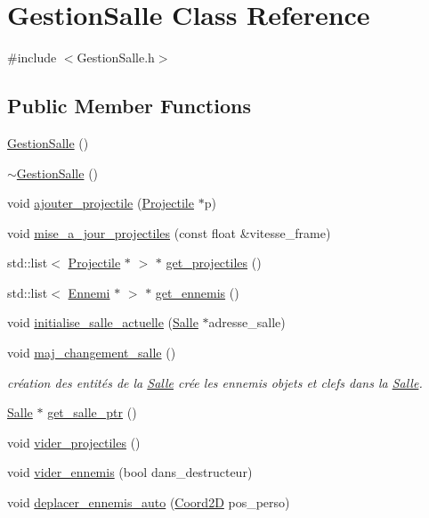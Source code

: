 \hypertarget{classGestionSalle}{}\section{Gestion\+Salle Class Reference}
\label{classGestionSalle}


{\ttfamily \#include $<$Gestion\+Salle.\+h$>$}

\subsection*{Public Member Functions}
\begin{DoxyCompactItemize}
\item 
\hyperlink{classGestionSalle_a1e182efaf1a90419768dbdcce5b3362f}{Gestion\+Salle} ()
\item 
\hyperlink{classGestionSalle_a94a5c95bc0b567b446c56eadfc4725e1}{$\sim$\+Gestion\+Salle} ()
\item 
void \hyperlink{classGestionSalle_afa4dfd73b84ebbcc6fd0e8ada8d19749}{ajouter\+\_\+projectile} (\hyperlink{classProjectile}{Projectile} $\ast$p)
\item 
void \hyperlink{classGestionSalle_aa95413560b18a41625f4532093e079ab}{mise\+\_\+a\+\_\+jour\+\_\+projectiles} (const float \&vitesse\+\_\+frame)
\item 
std\+::list$<$ \hyperlink{classProjectile}{Projectile} $\ast$ $>$ $\ast$ \hyperlink{classGestionSalle_a0ba600eb02a796327b9cb3f17a534e7e}{get\+\_\+projectiles} ()
\item 
std\+::list$<$ \hyperlink{classEnnemi}{Ennemi} $\ast$ $>$ $\ast$ \hyperlink{classGestionSalle_a1f6ba669677c1e7568bf31b0c04b6b56}{get\+\_\+ennemis} ()
\item 
void \hyperlink{classGestionSalle_a90451d453082150e6bc4aacee3185bf1}{initialise\+\_\+salle\+\_\+actuelle} (\hyperlink{classSalle}{Salle} $\ast$adresse\+\_\+salle)
\item 
void \hyperlink{classGestionSalle_aa6483fffd72836b96019b1c01149cb3d}{maj\+\_\+changement\+\_\+salle} ()
\begin{DoxyCompactList}\small\item\em création des entités de la \hyperlink{classSalle}{Salle} crée les ennemis objets et clefs dans la \hyperlink{classSalle}{Salle}. \end{DoxyCompactList}\item 
\hyperlink{classSalle}{Salle} $\ast$ \hyperlink{classGestionSalle_a956b17a928f170f399e063d730495f4c}{get\+\_\+salle\+\_\+ptr} ()
\item 
void \hyperlink{classGestionSalle_a18f9d9f3bceb83a0a2cee570e7936643}{vider\+\_\+projectiles} ()
\item 
void \hyperlink{classGestionSalle_a15b3371a3c0e135879034040c84d3ffe}{vider\+\_\+ennemis} (bool dans\+\_\+destructeur)
\item 
void \hyperlink{classGestionSalle_a2c7b2d5047f8f9759543ee32b68fa22b}{deplacer\+\_\+ennemis\+\_\+auto} (\hyperlink{classCoord2D}{Coord2D} pos\+\_\+perso)
\end{DoxyCompactItemize}


